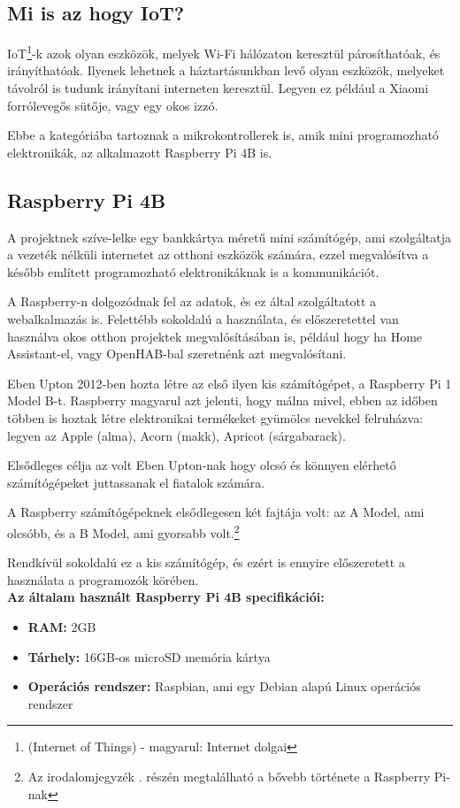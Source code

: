 \documentclass[
]{thesis-ekf}
\theoremstyle{definition}
\theoremstyle{remark}
\begin{document}
	\subsection{Mi is az hogy IoT?}
	IoT\footnote{(Internet of Things) - magyarul: Internet dolgai}-k azok olyan eszközök, melyek Wi-Fi hálózaton keresztül párosíthatóak, és irányíthatóak. Ilyenek lehetnek a háztartásunkban levő olyan eszközök, melyeket távolról is tudunk irányítani interneten keresztül. Legyen ez például a Xiaomi forrólevegős sütője, vagy egy okos izzó. 
	
	Ebbe a kategóriába tartoznak a mikrokontrollerek is, amik mini programozható elektronikák, az alkalmazott Raspberry Pi 4B is.
	
	\subsection{Raspberry Pi 4B}
	A projektnek szíve-lelke egy bankkártya méretű mini számítógép, ami szolgáltatja a vezeték nélküli internetet az otthoni eszközök számára, ezzel megvalósítva a később említett programozható elektronikáknak is a kommunikációt.
	
	A Raspberry-n dolgozódnak fel az adatok, és ez által szolgáltatott a webalkalmazás is. Felettébb sokoldalú a használata, és előszeretettel van használva okos otthon projektek megvalósításában is, például hogy ha Home Assistant-el, vagy OpenHAB-bal szeretnénk azt megvalósítani.
	
	Eben Upton 2012-ben hozta létre az első ilyen kis számítógépet, a Raspberry Pi 1 Model B-t. Raspberry magyarul azt jelenti, hogy málna mivel, ebben az időben többen is hoztak létre elektronikai termékeket gyümölcs nevekkel felruházva: legyen az Apple (alma), Acorn (makk), Apricot (sárgabarack).
	
	Elsődleges célja az volt Eben Upton-nak hogy olcsó és könnyen elérhető számítógépeket juttassanak el fiatalok számára.
	
	A Raspberry számítógépeknek elsődlegesen két fajtája volt: az A Model, ami olcsóbb, és a B Model, ami gyorsabb volt.\footnote{Az irodalomjegyzék \cite{raspberrypi-history}. részén megtalálható a bővebb története a Raspberry Pi-nak}
	
	Rendkívül sokoldalú ez a kis számítógép, és ezért is ennyire előszeretett a használata a programozók körében.\\
	\textbf{Az általam használt Raspberry Pi 4B specifikációi:}
	\begin{itemize}
		\item \textbf{RAM:} 2GB
		\item \textbf{Tárhely:} 16GB-os microSD memória kártya
		\item \textbf{Operációs rendszer:} Raspbian, ami egy Debian alapú Linux operációs rendszer
	\end{itemize}
	
\end{document}
